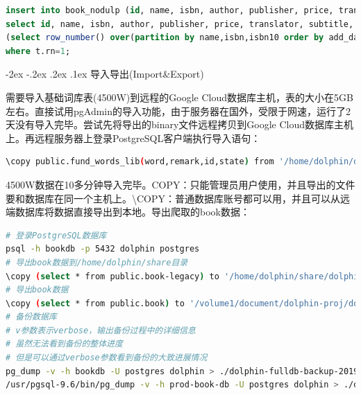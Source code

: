 \documentclass[8pt]{book}
\makeatletter
\numberwithin{dummy}{section}
\theoremstyle{ocrenumbox}
\theoremstyle{blacknumex}
\theoremstyle{blacknumbox}
\theoremstyle{ocrenum}
\renewcommand\paragraph{\@startsection{paragraph}{4}{\z@}
	{-2ex \@plus-.2ex \@minus .2ex}
	{.1ex}
	{\normalfont\small\sffamily\bfseries}}
\makeatother
\begin{document}
\begin{lstlisting}[language=SQL]
insert into book_nodulp (id, name, isbn, author, publisher, price, translator, subtitle, publish_year, add_date, binding, douban_id, content_intro, original_name, author_intro, content, update_date, score, issuer, pages, isbn10, source, summary, creator, industry_identifiers, language, description, categories)  
select id, name, isbn, author, publisher, price, translator, subtitle, publish_year, add_date, binding, douban_id, content_intro, original_name, author_intro, content, update_date, score, issuer, pages, isbn10, source, summary, creator, industry_identifiers, language, description, categories from   
(select row_number() over(partition by name,isbn,isbn10 order by add_date desc ) as rn, * from book_backup_500w) t  
where t.rn=1;
\end{lstlisting}


\paragraph{导入导出(Import\&Export)}

需要导入基础词库表(4500W)到远程的Google Cloud数据库主机，表的大小在5GB左右。直接试用pgAdmin的导入功能，由于服务器在国外，受限于网速，运行了2天没有导入完毕。尝试先将导出的binary文件远程拷贝到Google Cloud数据库主机上。再远程服务器上登录PostgreSQL客户端执行导入语句：

\begin{lstlisting}[language=Bash]
\copy public.fund_words_lib(word,remark,id,state) from '/home/dolphin/dolphin-words' encoding 'utf8';
\end{lstlisting}

4500W数据在10多分钟导入完毕。COPY：只能管理员用户使用，并且导出的文件要和数据库在同一个主机上。\textbackslash COPY：普通数据库账号都可以用，并且可以从远端数据库将数据直接导出到本地。导出爬取的book数据：

\begin{lstlisting}[language=Bash]
# 登录PostgreSQL数据库
psql -h bookdb -p 5432 dolphin postgres
# 导出book数据到/home/dolphin/share目录
\copy (select * from public.book-legacy) to '/home/dolphin/share/dolphin-book-binary-bak-201904012112' with Binary
# 导出book数据
\copy (select * from public.book) to '/volume1/document/dolphin-proj/dolphin-book-text-bak-201902091012'
# 备份数据库
# v参数表示verbose，输出备份过程中的详细信息
# 虽然无法看到备份的整体进度
# 但是可以通过verbose参数看到备份的大致进展情况
pg_dump -v -h bookdb -U postgres dolphin > ./dolphin-fulldb-backup-201902100030.bak
/usr/pgsql-9.6/bin/pg_dump -v -h prod-book-db -U postgres dolphin > ./dolphin-fulldb-backup-201903261013.bak
\end{lstlisting}
\end{document}
